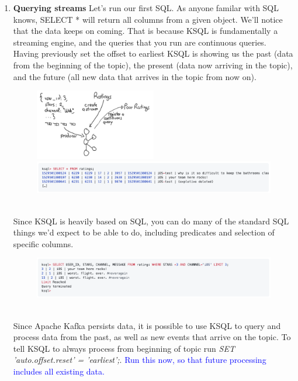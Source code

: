 \documentclass[10pt,a4paper]{article}
\begin{document}
\begin{enumerate}
 \item \textbf{Querying streams}
 Let’s run our first SQL. As anyone familar with SQL knows, SELECT * will return all columns from a given object. We’ll notice that the data keeps on coming. That is because KSQL is fundamentally a streaming engine, and the queries that you run are continuous queries. Having previously set the offset to earliest KSQL is showing us the past (data from the beginning of the topic), the present (data now arriving in the topic), and the future (all new data that arrives in the topic from now on).
  \begin{figure}[ht!]
 \hfill \includegraphics[width=150pt]{images/ksql-demo-3}\hspace*{\fill}
\vspace{0.1em} \center 
 \hfill \includegraphics[width=400pt]{images/ksql-cmd5}\hspace*{\fill} 
 \end{figure} \\
 Since KSQL is heavily based on SQL, you can do many of the standard SQL things we’d expect to be able to do, including predicates and selection of specific columns.
   \begin{figure}[ht!]
 \hfill \includegraphics[width=400pt]{images/ksql-cmd6}\hspace*{\fill} 
 \end{figure} \\
 Since Apache Kafka persists data, it is possible to use KSQL to query and process data from the past, as well as new events that arrive on the topic. To tell KSQL to always process from beginning of topic run \textit{SET 'auto.offset.reset' = 'earliest';}. \textcolor{blue}{Run this now, so that future processing includes all existing data.}

\end{enumerate}
\end{document}
